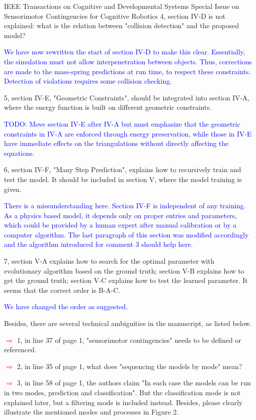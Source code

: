 \documentclass[a4paper,12pt]{letter}
\newcommand{\comment}[1]{\textcolor{blue}{#1}}
\newcommand{\marker}{\hspace*{-1.6em}\textcolor{red}{$\Longrightarrow$}}
\begin{document}
\begin{letter}{IEEE Transactions on Cognitive and Developmental Systems\newline
Special Issue on Sensorimotor Contingencies for Cognitive Robotics}
4, section IV-D is not explained: what is the relation between "collision detection" and the proposed model? 

\comment{We have now rewritten the start of section IV-D to make this clear. Essentially, the simulation must not allow interpenetration between objects. Thus, corrections are made to the mass-spring predictions at run time, to respect these constraints. Detection of violations requires some collision checking.}

5, section IV-E, "Geometric Constraints", should be integrated into section IV-A, where the energy function is built on different geometric constraints.

\comment{TODO: Move section IV-E after IV-A but must emphasize that the geometric constraints in IV-A are enforced through energy preservation, while those in IV-E have immediate effects on the triangulations without directly affecting the equations.}

6, section IV-F, "Many Step Prediction", explains how to recursively train and test the model. It should be included in section V, where the model training is given.

\comment{There is a missunderstanding here.  Section IV-F is independent of any training.  As a physics based model, it depends only on proper entries and parameters, which could be provided by a human expert after manual calibration or by a computer algorithm.  The last paragraph of this section was modified accordingly and the algorithm introduced for comment 3 should help here.}

7, section V-A explains how to search for the optimal parameter with evolutionary algorithm based on the ground truth; section V-B explains how to get the ground truth; section V-C explains how to test the learned parameter. It seems that the correct order is B-A-C.

\comment{We have changed the order as suggested.}

Besides, there are several technical ambiguities in the manuscript, as listed below. 

\marker
1, in line 37 of page 1, "sensorimotor contingencies" needs to be defined or referenced. 

\marker
2, in line 35 of page 1, what does "sequencing the models by mode" mean? 

\marker
3, in line 58 of page 1, the authors claim "In each case the models can be run in two modes, prediction and classification". But the classification mode is not explained later, but a filtering mode is included instead. Besides, please clearly illustrate the mentioned modes and processes in Figure 2.


\end{letter}
\end{document}

